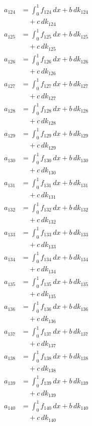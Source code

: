 \documentclass{article}
\begin{document}
\begin{align}
a_{124} &= \int_0^1 f_{124}\,dx + b\,dk_{124} \\
&\quad + c\,dk_{124} \\
a_{125} &= \int_0^1 f_{125}\,dx + b\,dk_{125} \\
&\quad + c\,dk_{125} \\
a_{126} &= \int_0^1 f_{126}\,dx + b\,dk_{126} \\
&\quad + c\,dk_{126} \\
a_{127} &= \int_0^1 f_{127}\,dx + b\,dk_{127} \\
&\quad + c\,dk_{127} \\
a_{128} &= \int_0^1 f_{128}\,dx + b\,dk_{128} \\
&\quad + c\,dk_{128} \\
a_{129} &= \int_0^1 f_{129}\,dx + b\,dk_{129} \\
&\quad + c\,dk_{129} \\
a_{130} &= \int_0^1 f_{130}\,dx + b\,dk_{130} \\
&\quad + c\,dk_{130} \\
a_{131} &= \int_0^1 f_{131}\,dx + b\,dk_{131} \\
&\quad + c\,dk_{131} \\
a_{132} &= \int_0^1 f_{132}\,dx + b\,dk_{132} \\
&\quad + c\,dk_{132} \\
a_{133} &= \int_0^1 f_{133}\,dx + b\,dk_{133} \\
&\quad + c\,dk_{133} \\
a_{134} &= \int_0^1 f_{134}\,dx + b\,dk_{134} \\
&\quad + c\,dk_{134} \\
a_{135} &= \int_0^1 f_{135}\,dx + b\,dk_{135} \\
&\quad + c\,dk_{135} \\
a_{136} &= \int_0^1 f_{136}\,dx + b\,dk_{136} \\
&\quad + c\,dk_{136} \\
a_{137} &= \int_0^1 f_{137}\,dx + b\,dk_{137} \\
&\quad + c\,dk_{137} \\
a_{138} &= \int_0^1 f_{138}\,dx + b\,dk_{138} \\
&\quad + c\,dk_{138} \\
a_{139} &= \int_0^1 f_{139}\,dx + b\,dk_{139} \\
&\quad + c\,dk_{139} \\
a_{140} &= \int_0^1 f_{140}\,dx + b\,dk_{140} \\
&\quad + c\,dk_{140} \\

\end{align}
\end{document}
